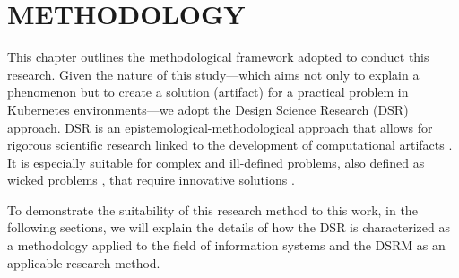 \chapter{METHODOLOGY}
\label{chap:methodology}

This chapter outlines the methodological framework adopted to conduct this research. Given the nature of this study—which aims not only to explain a phenomenon but to create a solution (artifact) for a practical problem in Kubernetes environments—we adopt the Design Science Research (DSR) approach. DSR is an epistemological-methodological approach that allows for rigorous scientific research linked to the development of computational artifacts \cite{pimentel_2020}. It is especially suitable for complex and ill-defined problems, also defined as wicked problems \cite{marshall_2008}, that require innovative solutions \cite{hevner_2004}.

To demonstrate the suitability of this research method to this work, in the following sections, we will explain the details of how the DSR is characterized as a methodology applied to the field of information systems and the DSRM as an applicable research method.







